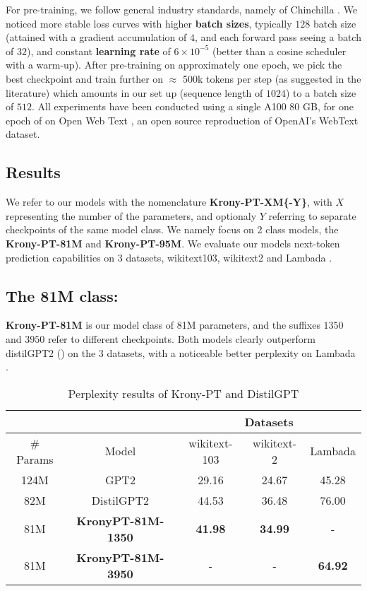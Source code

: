 \documentclass{article}
\begin{document}
{For pre-training, we follow general industry standards, namely of Chinchilla \cite{hoffmann2022training}. We noticed more stable loss curves with higher \textbf{batch sizes}, typically $128$ batch size (attained with a gradient accumulation of $4$, and each forward pass seeing a batch of $32$), and constant \textbf{learning rate} of $6 \times 10^{-5}$ (better than a cosine scheduler with a warm-up). After pre-training on approximately one epoch, we pick the best checkpoint and train further on $\approx$ 500k tokens per step (as suggested in the literature) which amounts in our set up (sequence length of $1024$) to a batch size of $512$. All experiments have been conducted using a single A100 80 GB, for one epoch of on Open Web Text \cite{Gokaslan2019OpenWeb}, an open source reproduction of OpenAI's WebText dataset.



\subsection{Results}%
\label{sub:results}

We refer to our models with the nomenclature \textbf{Krony-PT-XM\{-Y\}}, with $X$ representing the number of the parameters, and optionaly $Y$ referring to separate checkpoints of the same model class. We namely focus on 2 class models, the  \textbf{Krony-PT-81M} and \textbf{Krony-PT-95M}. We evaluate our models next-token prediction capabilities on 3 datasets, wikitext103, wikitext2 \cite{merity2016pointer} and Lambada \cite{paperno2016lambada}. 

\subsection{The 81M class:}%
\label{sub:The 81M class:}

\textbf{Krony-PT-81M} is our model class of 81M parameters, and the suffixes $1350$ and $3950$ refer to different checkpoints. Both models clearly outperform distilGPT2 (\cite{sanh2019distilbert}) on the 3 datasets, with a noticeable better perplexity on Lambada \cite{paperno2016lambada}.


\begin{table}[h]
\centering
\begin{tabular}{|c|c|c|c|c|}
\hline
 & & \multicolumn{3}{c|}{Datasets} \\ \hline
\# Params &  Model            & wikitext-103 & wikitext-2 & Lambada \\ \hline
124M      & GPT2              & 29.16        & 24.67      & 45.28      \\ \hline
82M       & DistilGPT2        & 44.53        & 36.48      & 76.00      \\ \hline
81M       & \textbf{KronyPT-81M-1350}  & \textbf{41.98}   & \textbf{34.99}      & -          \\ \hline
81M       & \textbf{KronyPT-81M-3950}  & -            	  & -          & \textbf{64.92}      \\ \hline
\end{tabular}
\caption{Perplexity results of Krony-PT and DistilGPT}
\end{table}


}
\end{document}
